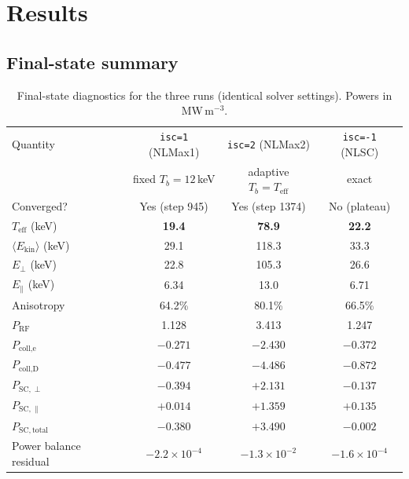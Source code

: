 \documentclass[11pt,a4paper]{article}
\begin{document}
\section{Results}

\subsection{Final-state summary}

\begin{table}[h]
\centering
\caption{Final-state diagnostics for the three runs (identical solver
  settings). Powers in MW\,m$^{-3}$.}
\label{tab:results}
\begin{tabular}{lccc}
\toprule
Quantity & \texttt{isc=1} (NLMax1) & \texttt{isc=2} (NLMax2) & \texttt{isc=-1} (NLSC) \\
         & fixed $T_b=12$\,keV     & adaptive $T_b=T_\text{eff}$ & exact \\
\midrule
Converged?                  & Yes (step 945)  & Yes (step 1374) & No (plateau)\footnotemark \\
$T_\text{eff}$ (keV)        & \textbf{19.4}   & \textbf{78.9}   & \textbf{22.2} \\
$\langle E_\text{kin}\rangle$ (keV) & 29.1    & 118.3           & 33.3 \\
$E_\perp$ (keV)             & 22.8            & 105.3           & 26.6 \\
$E_\parallel$ (keV)         & 6.34            & 13.0            & 6.71 \\
Anisotropy                  & 64.2\%          & 80.1\%          & 66.5\% \\
\midrule
$P_\text{RF}$               & 1.128           & 3.413           & 1.247 \\
$P_\text{coll,e}$           & $-0.271$        & $-2.430$        & $-0.372$ \\
$P_\text{coll,D}$           & $-0.477$        & $-4.486$        & $-0.872$ \\
$P_{\mathrm{SC},\perp}$     & $-0.394$        & $+2.131$        & $-0.137$ \\
$P_{\mathrm{SC},\parallel}$ & $+0.014$        & $+1.359$        & $+0.135$ \\
$P_{\mathrm{SC,total}}$     & $\mathbf{-0.380}$ & $\mathbf{+3.490}$ & $\mathbf{-0.002}$ \\
Power balance residual      & $-2.2\times10^{-4}$ & $-1.3\times10^{-2}$ & $-1.6\times10^{-4}$ \\
\bottomrule
\end{tabular}
\end{table}
\end{document}
